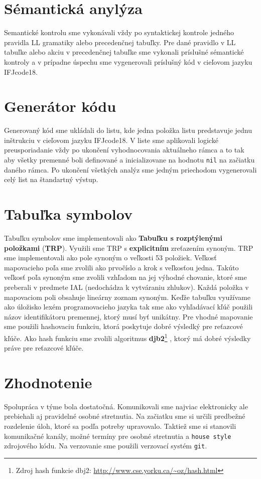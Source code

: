 \documentclass[a4paper, 11pt]{article}
\begin{document}
\section{Sémantická anylýza}
Semantické kontrolu sme vykonávali vždy po syntaktickej kontrole jedného pravidla LL gramatiky alebo precedenčnej tabuľky. Pre dané pravidlo v LL tabuľke alebo akciu v precedenčnej tabuľke sme vykonali príslušné sémantické kontroly a v prípadne úspechu sme vygenerovali príslušný kód v cieľovom jazyku IFJcode18.

\section{Generátor kódu}
Generovaný kód sme ukládali do listu, kde jedna položka listu predstavuje jednu inštrukciu v cieľovom jazyku IFJcode18. V liste sme aplikovali logické preusporiadanie vždy po ukončení vyhodnocovania aktuálneho rámca a to tak aby všetky premenné boli definované a inicializovane na hodnotu \texttt{nil} na začiatku daného rámca. Po ukončení všetkých analýz sme jedným priechodom vygenerovali celý list na štandartný výstup.
\section{Tabuľka symbolov}
Tabuľku symbolov sme implementovali ako \textbf{Tabuľku s rozptýlenými položkami} (\textbf{TRP}). Využili sme TRP s \textbf{explicitním} zreťazením synoným. TRP sme implementovali ako pole synoným o veľkosti 53 položiek. Veľkosť mapovacieho poľa sme zvolili ako prvočíslo a krok s veľkosťou jedna. Takúto veľkosť poľa synoným sme zvolili vzhľadom na jej výhodné chovanie, ktoré sme preberali v predmete IAL (nedochádza k vytváraniu zhlukov). Každá položka v mapovaciom poli obsahuje lineárny zoznam synoným. Keďže tabuľku využívame ako úložisko lexém programovacieho jazyka tak sme ako vyhľadávací kľúč použili názov identifikátoru premennej, ktorý musí byť unikátny. Pre vhodné mapovanie sme použili hashovaciu funkciu, ktorá poskytuje dobré výsledký pre reťazcové kľúče. Ako hash funkciu sme zvolili algoritmus \textbf{djb2}\footnote{Zdroj hash funkcie dbj2: 
	\url{http://www.cse.yorku.ca/~oz/hash.html}}
, ktorý má dobré výsledky práve pre reťazcové kľúče.
\section{Zhodnotenie}
Spolupráca v týme bola dostatočná. Komunikovali sme najviac elektronicky ale prebiehali aj pravidelné osobné stretnutia. Na začiatku sme si určili predbežné rozdelenie úloh, ktoré sa podľa potreby upravovalo. Taktiež sme si stanovili komunikačné kanály, možné termíny pre osobné stretnutia a \texttt{house style} zdrojového kódu. Na verzovanie sme použili verzovací systém \texttt{git}.
\end{document}
